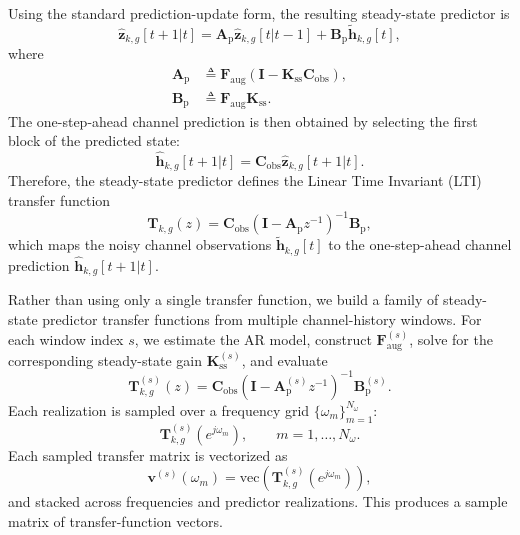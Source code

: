 \documentclass[lettersize,journal]{IEEEtran}
\begin{document}
Using the standard prediction-update form, the resulting steady-state predictor is
\begin{equation}
\hat{\mathbf{z}}_{k,g}[t+1|t]
=
\mathbf{A}_{\mathrm{p}}\hat{\mathbf{z}}_{k,g}[t|t-1]
+
\mathbf{B}_{\mathrm{p}}\tilde{\mathbf{h}}_{k,g}[t],
\label{eq:kg_ss_predictor_cfg}
\end{equation}
where
\begin{align}
\mathbf{A}_{\mathrm{p}}
&\triangleq
\mathbf{F}_{\mathrm{aug}}
\left(
\mathbf{I}
-
\mathbf{K}_{\mathrm{ss}}\mathbf{C}_{\mathrm{obs}}
\right),\\
\mathbf{B}_{\mathrm{p}}
&\triangleq
\mathbf{F}_{\mathrm{aug}}\mathbf{K}_{\mathrm{ss}}.
\end{align}
The one-step-ahead channel prediction is then obtained by selecting the first block of the predicted state:
\begin{equation}
\hat{\mathbf{h}}_{k,g}[t+1|t]
=
\mathbf{C}_{\mathrm{obs}}
\hat{\mathbf{z}}_{k,g}[t+1|t].
\end{equation}
Therefore, the steady-state predictor defines the Linear Time Invariant (LTI) transfer function
\begin{equation}
\mathbf{T}_{k,g}(z)
=
\mathbf{C}_{\mathrm{obs}}
\left(
\mathbf{I}
-
\mathbf{A}_{\mathrm{p}}z^{-1}
\right)^{-1}
\mathbf{B}_{\mathrm{p}},
\label{eq:kg_ss_tf_cfg}
\end{equation}
which maps the noisy channel observations $\tilde{\mathbf{h}}_{k,g}[t]$ to the one-step-ahead channel prediction $\hat{\mathbf{h}}_{k,g}[t+1|t]$.

Rather than using only a single transfer function, we build a family of steady-state predictor transfer functions from multiple channel-history windows. For each window index $s$, we estimate the AR model, construct $\mathbf{F}_{\mathrm{aug}}^{(s)}$, solve for the corresponding steady-state gain $\mathbf{K}_{\mathrm{ss}}^{(s)}$, and evaluate
\begin{equation}
\mathbf{T}_{k,g}^{(s)}(z)
=
\mathbf{C}_{\mathrm{obs}}
\left(
\mathbf{I}
-
\mathbf{A}_{\mathrm{p}}^{(s)}z^{-1}
\right)^{-1}
\mathbf{B}_{\mathrm{p}}^{(s)}.
\end{equation}
Each realization is sampled over a frequency grid $\{\omega_m\}_{m=1}^{N_{\omega}}$:
\begin{equation}
\mathbf{T}_{k,g}^{(s)}(e^{j\omega_m}),
\qquad
m=1,\dots,N_{\omega}.
\end{equation}
Each sampled transfer matrix is vectorized as
\begin{equation}
\mathbf{v}^{(s)}(\omega_m)
=
\mathrm{vec}\!\left(
\mathbf{T}_{k,g}^{(s)}(e^{j\omega_m})
\right),
\end{equation}
and stacked across frequencies and predictor realizations. This produces a sample matrix of transfer-function vectors.
\end{document}
